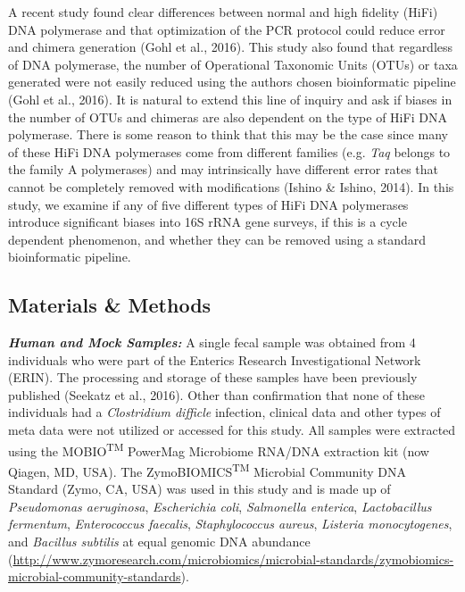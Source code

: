 \documentclass[12pt,]{article}
\begin{document}
A recent study found clear differences between normal and high fidelity
(HiFi) DNA polymerase and that optimization of the PCR protocol could
reduce error and chimera generation (Gohl et al., 2016). This study also
found that regardless of DNA polymerase, the number of Operational
Taxonomic Units (OTUs) or taxa generated were not easily reduced using
the authors chosen bioinformatic pipeline (Gohl et al., 2016). It is
natural to extend this line of inquiry and ask if biases in the number
of OTUs and chimeras are also dependent on the type of HiFi DNA
polymerase. There is some reason to think that this may be the case
since many of these HiFi DNA polymerases come from different families
(e.g. \emph{Taq} belongs to the family A polymerases) and may
intrinsically have different error rates that cannot be completely
removed with modifications (Ishino \& Ishino, 2014). In this study, we
examine if any of five different types of HiFi DNA polymerases introduce
significant biases into 16S rRNA gene surveys, if this is a cycle
dependent phenomenon, and whether they can be removed using a standard
bioinformatic pipeline.

\newpage

\subsection{Materials \& Methods}\label{materials-methods}

\textbf{\emph{Human and Mock Samples:}} A single fecal sample was
obtained from 4 individuals who were part of the Enterics Research
Investigational Network (ERIN). The processing and storage of these
samples have been previously published (Seekatz et al., 2016). Other
than confirmation that none of these individuals had a \emph{Clostridium
difficle} infection, clinical data and other types of meta data were not
utilized or accessed for this study. All samples were extracted using
the MOBIO\textsuperscript{TM} PowerMag Microbiome RNA/DNA extraction kit
(now Qiagen, MD, USA). The ZymoBIOMICS\textsuperscript{TM} Microbial
Community DNA Standard (Zymo, CA, USA) was used in this study and is
made up of \emph{Pseudomonas aeruginosa}, \emph{Escherichia coli},
\emph{Salmonella enterica}, \emph{Lactobacillus fermentum},
\emph{Enterococcus faecalis}, \emph{Staphylococcus aureus},
\emph{Listeria monocytogenes}, and \emph{Bacillus subtilis} at equal
genomic DNA abundance
(\url{http://www.zymoresearch.com/microbiomics/microbial-standards/zymobiomics-microbial-community-standards}).
\end{document}
